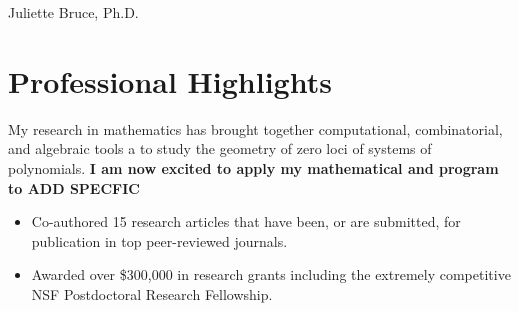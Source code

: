 \documentclass[
	10pt, %
]{FreemanCV}
\begin{document}
\begin{paracol}{2} %


\parbox[][0.11\textheight][c]{\linewidth}{ %
	\centering %
	
	{\sffamily\Huge Juliette Bruce, Ph.D.} %
	
	\medskip %
	
	
	\vfill %
}


\section{Professional Highlights}

My research in mathematics has brought together computational, combinatorial, and algebraic tools a to study the geometry of zero loci of systems of polynomials. \textbf{I am now excited to apply my mathematical and program to ADD SPECFIC}
\begin{itemize}[leftmargin=*]
\item Co-authored 15 research articles that have been, or are submitted, for publication in top peer-reviewed journals. 
\item Awarded over \$300,000 in research grants including the extremely competitive NSF Postdoctoral Research Fellowship.%
\end{itemize}


\end{paracol}
\end{document}
